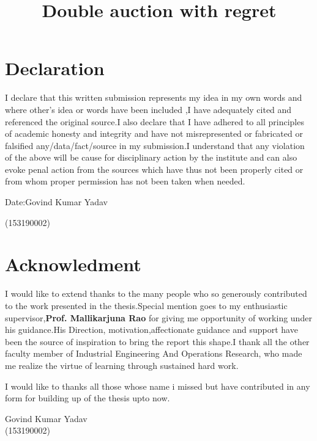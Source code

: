\documentclass[10pt,a4paper,oneside]{report}
\title{Double auction with regret}
\date{}
\begin{document}

\chapter*{Declaration}
I declare that this written submission represents my idea in my own words and where other's idea or words have been included ,I have adequately cited and referenced the original source.I also declare that I have adhered to all principles of academic honesty and integrity and have not misrepresented or fabricated or falsified any/data/fact/source in my submission.I understand that any violation of the above will be cause for disciplinary action by the institute and can also evoke penal action from the sources which have thus not been properly cited or from whom proper permission has not been taken when needed.
\vspace{1cm}


\noindent Date:\hfill Govind Kumar Yadav                     
\begin{flushright}(153190002)\end{flushright}
\chapter*{Acknowledment}
I would like to extend thanks to the many people who so generously contributed to the work presented in the thesis.Special mention goes to my enthusiastic supervisor,\textbf{Prof. Mallikarjuna Rao} for giving me opportunity of working under his guidance.His Direction, motivation,affectionate guidance and support have been the source of inspiration to bring the report this shape.I thank all the other faculty member of Industrial Engineering And Operations Research, who made me realize the virtue of learning through sustained hard work.
\vspace{6mm}

\noindent I would like to thanks all those whose name i missed but have contributed in any form for building up of the thesis upto now.
\vspace{1cm}

\begin{flushright}
Govind Kumar Yadav\\
(153190002)
\end{flushright}
\end{document}
